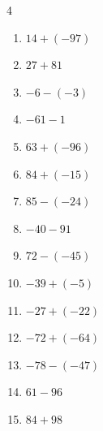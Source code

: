 \begin{multicols}{4}
\begin{enumerate}
        \phantom{$=9$}

  \item $14+(-97)$

        \phantom{$=-83$}

  \item $27+81$

        \phantom{$=108$}

  \item $-6-(-3)$

        \phantom{$=-3$}

  \item $-61-1$

        \phantom{$=-62$}

  \item $63+(-96)$

        \phantom{$=-33$}

  \item $84+(-15)$

        \phantom{$=69$}

  \item $85-(-24)$

        \phantom{$=109$}

  \item $-40-91$

        \phantom{$=-131$}

  \item $72-(-45)$

        \phantom{$=117$}

  \item $-39+(-5)$

        \phantom{$=-44$}

  \item $-27+(-22)$

        \phantom{$=-49$}

  \item $-72+(-64)$

        \phantom{$=-136$}

\columnbreak %

  \item $-78-(-47)$

        \phantom{$=-31$}

  \item $61-96$

        \phantom{$=-35$}

  \item $84+98$

        \phantom{$=182$}


\end{enumerate}
\end{multicols}
